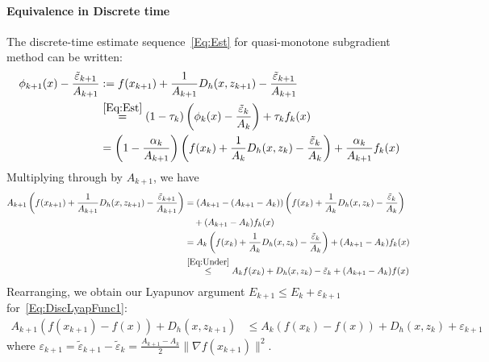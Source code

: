 \documentclass[11pt]{article}
\theoremstyle{plain}
\begin{document}
\paragraph{Equivalence in Discrete time}
The discrete-time estimate sequence~\eqref{Eq:Est} for quasi-monotone subgradient method can be written:
\begin{align*}
\phi_{k+1}(x) - \frac{\tilde \varepsilon_{k+1}}{A_{k+1}} &:= f(x_{k+1}) + \frac{1}{A_{k+1}}D_h(x, z_{k+1}) - \frac{\tilde \varepsilon_{k+1}}{A_{k+1}}\\
& \overset{\eqref{Eq:Est}}{=} (1 - \tau_k) \left(\phi_k(x) - \frac{\tilde \varepsilon_k}{A_k}\right) + \tau_k f_k(x) \\
&= \left(1 - \frac{\alpha_k}{A_{k+1}} \right)\left(f(x_k) +\frac{1}{A_k} D_h(x, z_k) -\frac{\tilde \varepsilon_k}{A_k}\right) + \frac{\alpha_k}{A_{k+1}} f_k(x)
\end{align*}
Multiplying through by $A_{k+1}$, we have
\begin{align*}
A_{k+1} \left(f(x_{k+1}) + \frac{1}{A_{k+1}}D_h(x, z_{k+1}) - \frac{\tilde \varepsilon_{k+1}}{A_{k+1}}\right) &= (A_{k+1} - (A_{k+1} - A_k)) \left(f(x_k) + \frac{1}{A_k}D_h(x, z_k) - \frac{\tilde \varepsilon_k}{A_k}\right)\\
&\quad  + (A_{k+1} - A_k) f_k(x)\\
&=  A_k \left(f(x_k) + \frac{1}{A_k}D_h(x, z_k) - \frac{\tilde \varepsilon_k}{A_k}\right) + (A_{k+1} - A_k) f_k(x)\\
& \overset{\eqref{Eq:Under}}{\leq}  A_k f(x_k) + D_h(x, z_k) - \tilde \varepsilon_k + (A_{k+1} - A_k) f(x)\
\end{align*}
Rearranging, we obtain our Lyapunov argument $E_{k+1} \leq E_k + \varepsilon_{k+1}$ for~\eqref{Eq:DiscLyapFunc1}:
\begin{align*}
A_{k+1}(f(x_{k+1}) - f(x)) + D_h(x, z_{k+1}) &\leq A_k (f(x_k) - f(x)) + D_h(x, z_k) + \varepsilon_{k+1}
\end{align*}
where $\varepsilon_{k+1} = \tilde \varepsilon_{k+1} - \tilde \varepsilon_k = \frac{A_{k+1} -A_k}{2}\|\nabla f(x_{k+1})\|^2$.
\end{document}
